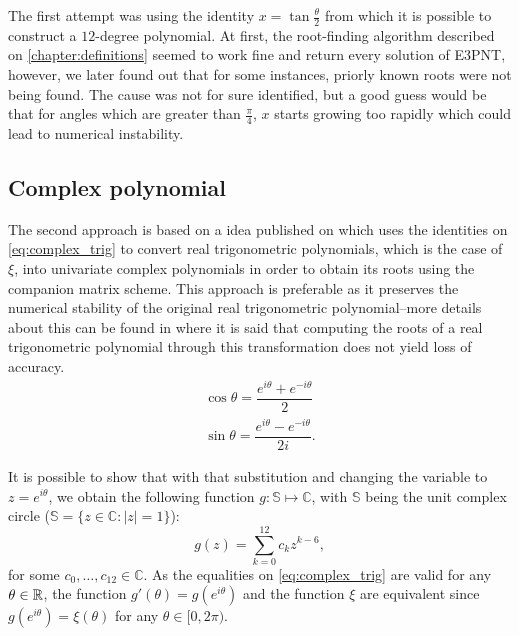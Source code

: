 The first attempt was using the identity $x = \tan{\frac{\theta}{2}}$ from which it is possible to construct a $12$-degree polynomial. At first,  the root-finding algorithm described on \autoref{chapter:definitions} seemed to work fine and return every solution of E3PNT, however, we later found out that for some instances, priorly known roots were not being found. The cause was not for sure identified, but a good guess would be that for angles which are greater than $\frac{\pi}{4}$, $x$ starts growing too rapidly which could lead to numerical instability.

\subsection{Complex polynomial}

The second approach is based on a idea published on  which uses the identities on \autoref{eq:complex_trig} to convert real trigonometric polynomials, which is the case of $\xi$, into univariate complex polynomials in order to obtain its roots using the companion matrix scheme. This approach is preferable as it preserves the numerical stability of the original real trigonometric polynomial--more details about this can be found in  where it is said that computing the roots of a real trigonometric polynomial through this transformation does not yield loss of accuracy.
\begin{align}\label{eq:complex_trig}
\cos{\theta} = \dfrac{e^{i\theta} + e^{-i\theta}}{2}\\
\sin{\theta} = \dfrac{e^{i\theta} - e^{-i\theta}}{2i}.
\end{align}

It is possible to show that with that substitution and changing the variable to $z=e^{i\theta}$, we obtain the following function $g : \mathbb{S} \mapsto \mathbb{C}$, with $\mathbb{S}$ being the unit complex circle ($\mathbb{S} = \{z \in \mathbb{C} : |z|=1\}$):
\begin{equation}
g(z)=\sum_{k=0}^{12} c_k z^{k-6},
\end{equation}
for some $c_0, \dots, c_{12} \in \mathbb{C}$. As the equalities on \autoref{eq:complex_trig} are valid for any $\theta \in \mathbb{R}$, the function $g'(\theta)=g(e^{i\theta})$ and the function $\xi$ are equivalent since $g(e^{i\theta}) = \xi(\theta)$ for any $\theta \in [0, 2\pi)$. 


